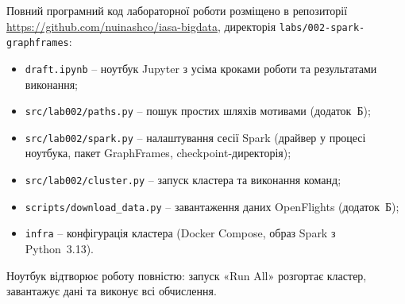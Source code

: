 \documentclass{iasa-lab}
\begin{document}
Повний програмний код лабораторної роботи розміщено в репозиторії \url{https://github.com/nuinashco/iasa-bigdata}, директорія \texttt{labs/002-spark-graphframes}:
\begin{itemize}
  \item \texttt{draft.ipynb} -- ноутбук Jupyter з усіма кроками роботи та результатами виконання;
  \item \texttt{src/lab002/paths.py} -- пошук простих шляхів мотивами (додаток~Б);
  \item \texttt{src/lab002/spark.py} -- налаштування сесії Spark (драйвер у процесі ноутбука, пакет GraphFrames, checkpoint-директорія);
  \item \texttt{src/lab002/cluster.py} -- запуск кластера та виконання команд;
  \item \texttt{scripts/download\_data.py} -- завантаження даних OpenFlights (додаток~Б);
  \item \texttt{infra} -- конфігурація кластера (Docker Compose, образ Spark з Python~3.13).
\end{itemize}

Ноутбук відтворює роботу повністю: запуск «Run All» розгортає кластер, завантажує дані та виконує всі обчислення.


\setcounter{lstlisting}{0}
\renewcommand{\thelstlisting}{Б.\arabic{lstlisting}}



\end{document}

